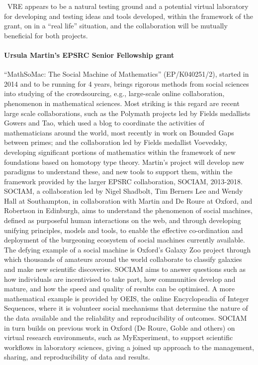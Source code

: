 \TheProject\ VRE appears to be a natural testing ground and a potential virtual
laboratory for developing and testing ideas and tools developed, within the
framework of the grant, on in a ``real life'' situation, and the collaboration
will be mutually beneficial for both projects.


\paragraph{Ursula Martin's EPSRC Senior Fellowship grant}
``MathSoMac: The Social Machine of Mathematics'' (EP/K040251/2), started in 2014 and to be running
for 4 years, brings rigorous methods from social
sciences into studying of the crowdsourcing, e.g., large-scale online
collaboration, phenomenon in mathematical sciences.
 Most striking is this regard are recent large scale collaborations, such
as the Polymath projects led by Fields medallists Gowers and Tao, which used a blog to coordinate the
activities of mathematicians around the world, most recently in work on Bounded Gaps between primes; and
the collaboration led by Fields medallist Voevedsky, developing significant portions of mathematics
within the framework of new foundations based on homotopy type theory. Martin’s project will develop new
paradigms to understand these, and new tools to support them, within the framework provided by the
larger EPSRC collaboration, SOCIAM, 2013-2018. SOCIAM, a collaboration led by Nigel Shadbolt, Tim
Berners Lee and Wendy Hall at Southampton, in collaboration with Martin and De Roure at Oxford, and
Robertson in Edinburgh, aims to understand the phenomenon of social machines, defined as purposeful
human interactions on the web, and through developing unifying principles, models and tools, to enable
the effective co-ordination and deployment of the burgeoning ecosystem of social machines currently
available. The defying example of a social machine is Oxford’s Galaxy Zoo project through which
thousands of amateurs around the world collaborate to classify galaxies and make new scientific
discoveries. SOCIAM aims to answer questions such as how individuals are incentivised to take part, how
communities develop and mature, and how the speed and quality of results can be optimised. A more
mathematical example is provided by OEIS, the online Encyclopeadia of Integer Sequences, where it is
volunteer social mechanisms that determine the nature of the data available and the reliability and
reproducibility of outcomes. SOCIAM in turn builds on previous work in Oxford (De Roure, Goble and
others) on virtual research environments, such as MyExperiment, to support scientific workflows in
laboratory sciences,  giving a joined up approach to the management, sharing, and reproducibility of
data and results.

